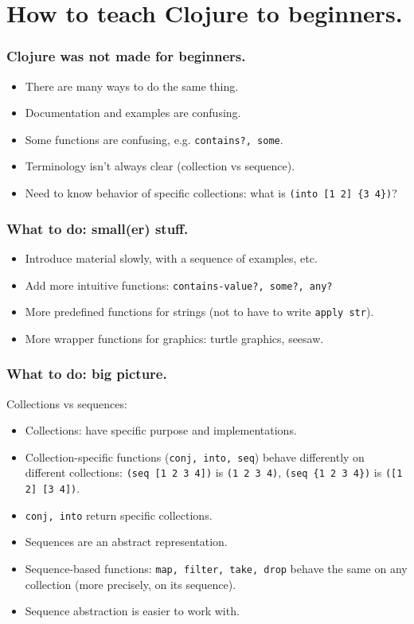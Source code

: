 \documentclass{beamer}
\begin{document}
\section{How to teach Clojure to beginners.}

\begin{frame}
  \frametitle{Clojure was not made for beginners.}
\begin{itemize}
\item There are many ways to do the same thing.
\item Documentation and examples are confusing.
\item Some functions are confusing, e.g. {\tt contains?, some}.
\item Terminology isn't always clear (collection vs sequence).
\item Need to know behavior of specific collections: what is {\tt (into [1 2] \{3 4\})}?
\end{itemize}
\end{frame}

\begin{frame}
  \frametitle{What to do: small(er) stuff.}
\begin{itemize}
\item Introduce material slowly, with a sequence of examples, etc.
\item Add more intuitive functions: {\tt contains-value?, some?, any?}
\item More predefined functions for strings (not to have to write {\tt apply str}).
\item More wrapper functions for graphics: turtle graphics, seesaw. 
\end{itemize}
\end{frame}

\begin{frame}
  \frametitle{What to do: big picture.}
Collections vs sequences:
\begin{itemize}
\item Collections: have specific purpose and implementations. 
\item Collection-specific functions ({\tt conj, into, seq}) behave differently on different collections:
{\tt (seq [1 2 3 4])} is {\tt (1 2 3 4)}, {\tt (seq \{1 2 3 4\})} is {\tt ([1 2] [3 4])}. 
\item {\tt conj, into} return specific collections. 
\item Sequences are an abstract representation. 
\item Sequence-based functions: {\tt map, filter, take, drop} behave the same on any collection (more precisely, on its sequence). 
\item Sequence abstraction is easier to work with. 
\end{itemize}
\end{frame}
\end{document}
